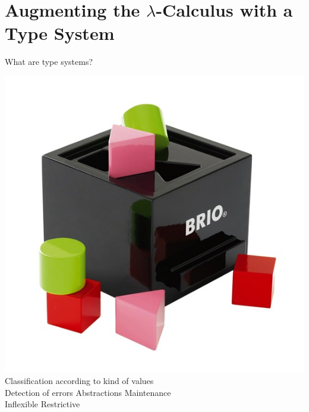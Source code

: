 \documentclass[xcolor=dvipsnames]{beamer}
\begin{document}
\section{Augmenting the $\lambda$-Calculus with a Type System}

\begin{frame}{What are type systems?}
  \begin{center}
    \includegraphics[scale=1]{shape_toy.jpg} \\
    Classification according to kind of values \\
    \bigskip
    \textcolor{OliveGreen}{Detection of errors \qquad Abstractions \qquad Maintenance} \\
    \textcolor{BrickRed}{Inflexible \qquad Restrictive}
  \end{center}
\end{frame}
\end{document}
